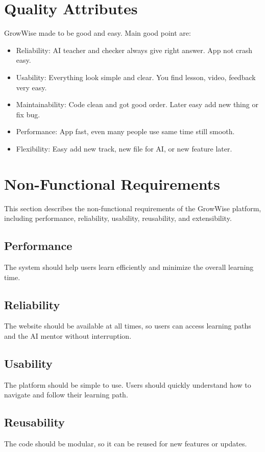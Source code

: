 \documentclass{FastFyp}
\begin{document}
\section{Quality Attributes}

GrowWise made to be good and easy. Main good point are:

\begin{itemize}
    \item Reliability: AI teacher and checker always give right answer. App not crash easy.
    \item Usability: Everything look simple and clear. You find lesson, video, feedback very easy.
    \item Maintainability: Code clean and got good order. Later easy add new thing or fix bug.
    \item Performance: App fast, even many people use same time still smooth.
    \item Flexibility: Easy add new track, new file for AI, or new feature later.
\end{itemize}

\section{Non-Functional Requirements}

This section describes the non-functional requirements of the GrowWise platform, including performance, reliability, usability, reusability, and extensibility.

\subsection{Performance}
The system should help users learn efficiently and minimize the overall learning time.

\subsection{Reliability}
The website should be available at all times, so users can access learning paths and the AI mentor without interruption.

\subsection{Usability}
The platform should be simple to use. Users should quickly understand how to navigate and follow their learning path.

\subsection{Reusability}
The code should be modular, so it can be reused for new features or updates.
\end{document}
